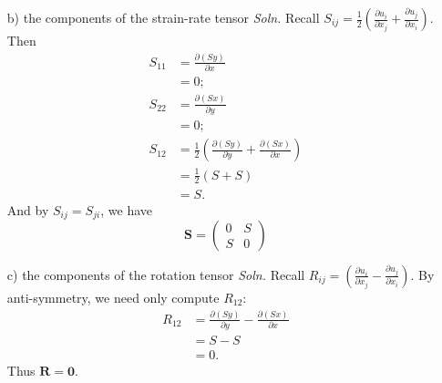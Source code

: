 \documentclass{article}
\begin{document}
\begin{itemize}
\begin{itemize}
        \item[b)] the components of the strain-rate tensor
        \newline\newline
        \textit{Soln.} Recall $S_{ij} = \frac{1}{2}\left(\frac{\partial u_{i}}{\partial x_j} + \frac{\partial u_j}{\partial x_i}\right)$. Then
        \begin{align*}
            S_{11} &= \frac{\partial (Sy)}{\partial x}\\
            &= 0;\\
            S_{22} &= \frac{\partial (Sx)}{\partial y}\\
            &= 0;\\
            S_{12} &= \frac{1}{2}\left(\frac{\partial (Sy)}{\partial y} + \frac{\partial (Sx)}{\partial x}\right)\\
            &= \frac{1}{2}(S + S)\\
            &= S.
        \end{align*}
        And by $S_{ij} = S_{ji}$, we have
        \[\mathbf{S} = \begin{pmatrix}
            0 & S\\
            S & 0
        \end{pmatrix}\]
        

        \item[c)] the components of the rotation tensor
        \newline\newline
        \textit{Soln.} Recall $R_{ij} = \left(\frac{\partial u_{i}}{\partial x_j} - \frac{\partial u_j}{\partial x_i}\right)$. By anti-symmetry, we need only compute $R_{12}$:
        \begin{align*}
            R_{12} &= \frac{\partial (Sy)}{\partial y} - \frac{\partial (Sx)}{\partial x}\\
            &= S - S\\
            &= 0.
        \end{align*}
        Thus $\mathbf{R} = \mathbf{0}$. 


\end{itemize}
\end{itemize}
\end{document}
